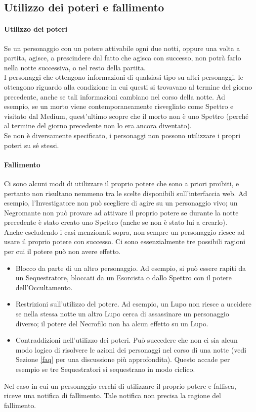 \documentclass[a4paper,10pt]{article}
\begin{document}
\subsection{Utilizzo dei poteri e fallimento}
\label{fallimento}

\paragraph{Utilizzo dei poteri} 
Se un personaggio con un potere attivabile ogni due notti, oppure una volta a
partita, agisce, a prescindere dal fatto che agisca con successo, non potrà
farlo nella notte successiva, o nel resto della partita. \\
I personaggi che ottengono informazioni di qualsiasi tipo su altri personaggi,
le ottengono riguardo alla condizione in cui questi si trovavano al termine del
giorno precedente, anche se tali informazioni cambiano nel corso della notte.
Ad esempio, se un morto viene contemporaneamente risvegliato come Spettro e
visitato dal Medium, quest'ultimo scopre che il morto non è uno Spettro (perché
al termine del giorno precedente non lo era ancora diventato).\\
Se non è diversamente specificato, i personaggi non possono utilizzare i propri
poteri su sé stessi.

\paragraph{Fallimento} Ci sono alcuni modi di utilizzare il proprio potere che
sono a priori proibiti, e pertanto non risultano nemmeno tra le scelte
disponibili sull'interfaccia web. Ad esempio, l'Investigatore non può scegliere
di agire su un personaggio vivo; un Negromante non può provare ad
attivare il proprio potere se durante la notte precedente è stato creato uno
Spettro (anche se non è stato lui a crearlo).
\vspace{1.5 mm} \\
Anche escludendo i casi menzionati sopra, non sempre un personaggio riesce ad
usare il proprio potere con successo.
Ci sono essenzialmente tre possibili ragioni per cui il potere può non avere
effetto.
\begin{itemize}
 \item Blocco da parte di un altro personaggio. Ad esempio, si può essere rapiti
da un Sequestratore, bloccati da un Esorcista o dallo Spettro con il potere
dell'Occultamento.
 \item Restrizioni sull'utilizzo del potere. Ad esempio, un Lupo non riesce a
uccidere se nella stessa notte un altro Lupo cerca di assassinare un personaggio
diverso; il potere del Necrofilo non ha alcun effetto su un Lupo.
 \item Contraddizioni nell'utilizzo dei poteri. Può succedere che non ci sia
alcun modo logico di risolvere le azioni dei personaggi nel corso di una notte
(vedi Sezione \ref{faq} per una discussione più approfondita). Questo accade per
esempio se tre Sequestratori si sequestrano in modo ciclico.
\end{itemize}
Nel caso in cui un personaggio cerchi di utilizzare il proprio potere e
fallisca, riceve una notifica di fallimento. Tale notifica non precisa la
ragione del fallimento.
\end{document}
